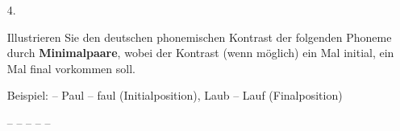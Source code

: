 {\begin{frame}
\begin{itemize}
\end{itemize}

\end{frame}

\begin{frame}

\begin{itemize}	
\item[4.]{Illustrieren Sie den deutschen phonemischen Kontrast der folgenden Phoneme durch \textbf{Minimalpaare}, wobei der Kontrast (wenn möglich) ein Mal initial, ein Mal final vorkommen soll.

Beispiel: \textipa{[p]} -- \textipa{[f]} Paul -- faul (Initialposition), Laub -- Lauf (Finalposition)}

\begin{exe}
	\settowidth{}
	\begin{xlist}
		\ex \textipa{[m]} -- \textipa{[n]} 
		\ex \textipa{[p]} -- \textipa{[b]} 
		\ex \textipa{[h]} -- \textipa{[v]} 
		\ex \textipa{[n]} -- \textipa{[N]} 
		\ex \textipa{[f]} -- \textipa{[v]} 
	\end{xlist}
\end{exe}
		
\end{itemize}

\end{frame}

}%






